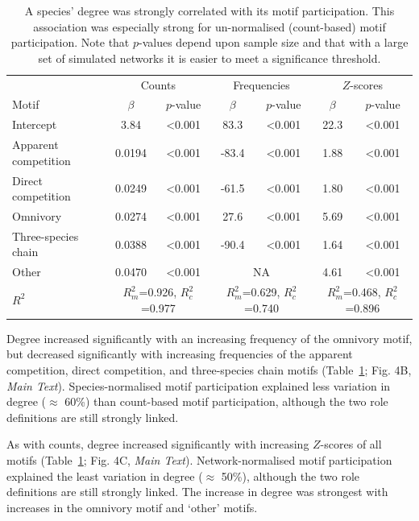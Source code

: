 \documentclass[12pt]{article}
\begin{document}
			\begin{table}[hb!]
    			\caption{A species' degree was strongly correlated with its motif participation. This association was especially strong for un-normalised (count-based) motif participation. Note that $p$-values depend upon sample size and that with a large set of simulated networks it is easier to meet a significance threshold.}
    			\label{tab:motifs_vs_deg}
    			\begin{tabular}{l | c c | c c | c c}
    			& \multicolumn{2}{c|}{Counts} & \multicolumn{2}{c}{Frequencies} & \multicolumn{2}{|c}{$Z$-scores} \\
    			Motif & $\beta$ & $p$-value & $\beta$ & $p$-value & $\beta$ & $p$-value \\
    			\hline
    			Intercept &  3.84  & \textless0.001 & 83.3 & \textless0.001 & 22.3 & \textless0.001\\
    			\hline
    			Apparent competition       &  0.0194  & \textless0.001 & -83.4 & \textless0.001 & 1.88 & \textless0.001 \\
    			Direct competition       &  0.0249  & \textless0.001 & -61.5 & \textless0.001 & 1.80 & \textless0.001\\
    			Omnivory       &  0.0274  & \textless0.001 & 27.6 & \textless0.001 & 5.69 & \textless0.001\\
    			Three-species chain       &  0.0388  & \textless0.001 & -90.4 & \textless0.001 & 1.64 & \textless0.001\\
    			Other    &  0.0470  & \textless0.001 & \multicolumn{2}{c|}{NA} & 4.61 & \textless0.001 \\
    			\hline
    			$R^2$ & \multicolumn{2}{c|}{\tiny{$R^2_m$=0.926, $R^2_c$=0.977}} & \multicolumn{2}{c}{\tiny{$R^2_m$=0.629, $R^2_c$=0.740}} & \multicolumn{2}{|c}{\tiny{$R^2_m$=0.468, $R^2_c$=0.896}} \\
    			\end{tabular}
    			\end{table}


			Degree increased significantly with an increasing frequency of the omnivory motif, but decreased significantly with increasing frequencies of the apparent competition, direct competition, and three-species chain motifs (Table~\ref{tab:motifs_vs_deg}; Fig. 4B, \emph{Main Text}).
			Species-normalised motif participation explained less variation in degree ($\approx$ 60\%) than count-based motif participation, although the two role definitions are still strongly linked.


			As with counts, degree increased significantly with increasing $Z$-scores of all motifs (Table~\ref{tab:motifs_vs_deg}; Fig. 4C, \emph{Main Text}).
			Network-normalised motif participation explained the least variation in degree ($\approx$ 50\%), although the two role definitions are still strongly linked.
			The increase in degree was strongest with increases in the omnivory motif and `other' motifs.
\end{document}
